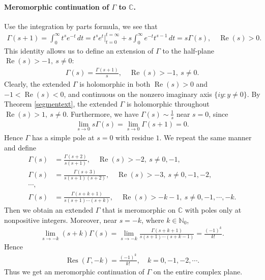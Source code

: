 \documentclass{article}
\numberwithin{equation}{section}
\newcommand{\bbC}{\mathbb{C}}
\newcommand{\bbN}{\mathbb{N}}
\DeclareMathOperator{\re}{Re}
\DeclareMathOperator{\res}{Res}
\theoremstyle{plain}
\theoremstyle{definition}
\begin{document}
\paragraph{Meromorphic continuation of $\Gamma$ to $\bbC$.} Use the integration by parts formula, we see that
\begin{align*}
\Gamma(s+1)=\int_0^\infty t^se^{-t}\,dt=t^se^t\big|_{t=0}^{t=\infty}+s\int_0^\infty e^{-t}t^{s-1}\,dt=s\Gamma(s),\quad\re(s)>0.
\end{align*}
This identity allows us to define an extension of $\Gamma$ to the half-plane $\re(s)>-1,\ s\neq 0$:
\begin{align*}
\Gamma(s)=\frac{\Gamma(s+1)}{s},\quad\re(s)>-1,\ s\neq 0.
\end{align*}
Clearly, the extended $\Gamma$ is holomorphic in both $\re(s)>0$ and $-1<\re(s)<0$, and continuous on the nonzero imaginary axis $\{iy:y\neq 0\}$. By Theorem \ref{segmentext}, the extended $\Gamma$ is holomorphic throughout $\re(s)>1,\ s\neq 0$. Furthermore, we have $\Gamma(s)\sim\frac{1}{s}$ near $s=0$, since
\begin{align*}
	\lim_{s\to 0}s\Gamma(s)=\lim_{s\to 0}\Gamma(s+1)=0.
\end{align*}
Hence $\Gamma$ has a simple pole at $s=0$ with residue $1$. We repeat the same manner and define
\begin{align*}
	\Gamma(s)&=\frac{\Gamma(s+2)}{s(s+1)},\quad\re(s)>-2,\ s\neq 0,-1,\\
	\Gamma(s)&=\frac{\Gamma(s+3)}{s(s+1)(s+2)},\quad\re(s)>-3,\ s\neq 0,-1,-2,\\
	\cdots,\\
	\Gamma(s)&=\frac{\Gamma(s+k+1)}{s(s+1)\cdots(s+k)},\quad\re(s)>-k-1,\ s\neq 0,-1,\cdots,-k.
\end{align*}
Then we obtain an extended $\Gamma$ that is meromorphic on $\bbC$ with poles only at nonpositive integers. Moreover, near $s=-k$, where $k\in\bbN_0$,
\begin{align*}
	\lim_{s\to -k}(s+k)\Gamma(s)=\lim_{s\to -k}\frac{\Gamma(s+k+1)}{s(s+1)\cdots(s+k-1)}=\frac{(-1)^k}{k!}.
\end{align*}
Hence
\begin{align*}
	\res(\Gamma,-k)=\frac{(-1)^k}{k!},\quad k=0,-1,-2,\cdots.
\end{align*}
Thus we get an meromorphic continuation of $\Gamma$ on the entire complex plane.
\end{document}
